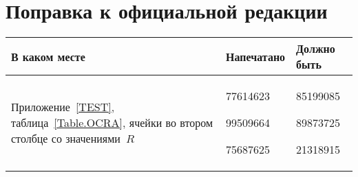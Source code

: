 \clearpage
\chapter*{\mbox{}\hfill Поправка к официальной редакции\hfill\mbox{}}

\mbox{}

\begin{center}
\begin{tabular}{|p{7cm}|p{3.5cm}|p{3.5cm}|}
\hline
В каком месте & Напечатано & Должно быть\\
\hline
\hline
Приложение~\ref{TEST}, таблица~\ref{Table.OCRA},
ячейки во втором столбце со значениями~$R$
&
77614623\par 
99509664\par
75687625 
& 
85199085\par 
89873725\par
21318915
\\
\hline
\end{tabular}
\end{center}